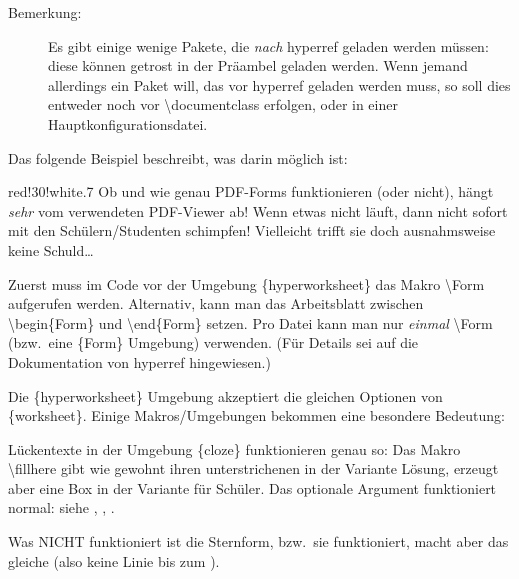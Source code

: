\documentclass[hyperworksheet]{drcschool}
\newcommand*{\cs}[1]{\textup{\ttfamily\textbackslash#1}}                        %
\newcommand*{\pkg}[1]{\textup{\ttfamily#1}}                                     %
\newcommand*{\env}[1]{\textup{\ttfamily\{#1\}}}                                 %
\begin{document}
\begin{description}
\item[Bemerkung:]
Es gibt einige wenige Pakete, die \emph{nach} \pkg{hyperref} geladen werden müssen:
diese können getrost in der Präambel geladen werden. Wenn jemand allerdings ein Paket
will, das vor \pkg{hyperref} geladen werden muss, so soll dies entweder noch vor
\cs{documentclass} erfolgen, oder in einer Hauptkonfigurationsdatei.
\end{description}

Das folgende Beispiel beschreibt, was darin möglich ist:

\Form  %
\begin{hyperworksheet}

\begin{center}
\begin{colorminipage}{red!30!white}{.7\linewidth}
Ob und wie genau PDF-Forms funktionieren (oder nicht), hängt \emph{sehr} vom
verwendeten PDF-Viewer ab! Wenn etwas nicht läuft, dann nicht sofort mit den
Schülern/Studenten schimpfen! Vielleicht trifft sie doch ausnahmsweise keine
Schuld\ldots
\end{colorminipage}
\end{center}

\noindent
Zuerst muss im Code vor der Umgebung \env{hyperworksheet} das Makro \cs{Form}
aufgerufen werden. Alternativ, kann man das Arbeitsblatt zwischen
\cs{begin\{Form\}} und \cs{end\{Form\}} setzen. Pro Datei kann man nur \emph{einmal}
\cs{Form} (bzw.~eine \env{Form} Umgebung) verwenden. (Für Details sei auf die Dokumentation
von \pkg{hyperref} hingewiesen.)

Die \env{hyperworksheet} Umgebung akzeptiert die gleichen Optionen von \env{worksheet}.
Einige Makros/Umgebungen bekommen eine besondere Bedeutung:

\exercise[Lückentexte]
\begin{cloze}
Lückentexte in der Umgebung \env{cloze} funktionieren genau so: Das Makro \cs{fillhere}
gibt wie gewohnt ihren unterstrichenen  in der Variante  Lösung,
erzeugt aber eine  Box in der Variante für Schüler.
Das optionale Argument funktioniert normal: siehe , ,
.

Was NICHT funktioniert ist die Sternform, bzw.~sie funktioniert, macht aber das gleiche
(also keine Linie bis zum ).
\end{cloze}


\end{hyperworksheet}
\end{document}
